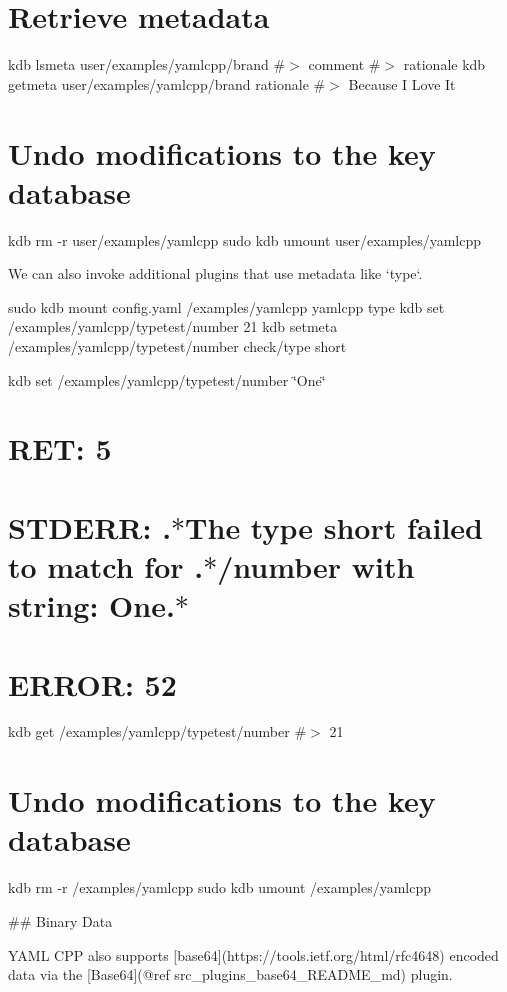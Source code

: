 \section*{Retrieve metadata}

kdb lsmeta user/examples/yamlcpp/brand \#$>$ comment \#$>$ rationale kdb getmeta user/examples/yamlcpp/brand rationale \#$>$ Because I Love It

\section*{Undo modifications to the key database}

kdb rm -\/r user/examples/yamlcpp sudo kdb umount user/examples/yamlcpp 
\begin{DoxyCode}
We can also invoke additional plugins that use metadata like `type`.
\end{DoxyCode}
 sudo kdb mount config.\+yaml /examples/yamlcpp yamlcpp type kdb set /examples/yamlcpp/typetest/number 21 kdb setmeta /examples/yamlcpp/typetest/number check/type short

kdb set /examples/yamlcpp/typetest/number \char`\"{}\+One\char`\"{} \section*{R\+ET\+: 5}

\section*{S\+T\+D\+E\+RR\+: .$\ast$\+The type short failed to match for .$\ast$/number with string\+: One.$\ast$}

\section*{E\+R\+R\+OR\+: 52}

kdb get /examples/yamlcpp/typetest/number \#$>$ 21

\section*{Undo modifications to the key database}

kdb rm -\/r /examples/yamlcpp sudo kdb umount /examples/yamlcpp 
\begin{DoxyCode}
## Binary Data

YAML CPP also supports [base64](https://tools.ietf.org/html/rfc4648) encoded data via the [Base64](@ref
       src\_plugins\_base64\_README\_md) plugin.
\end{DoxyCode}
